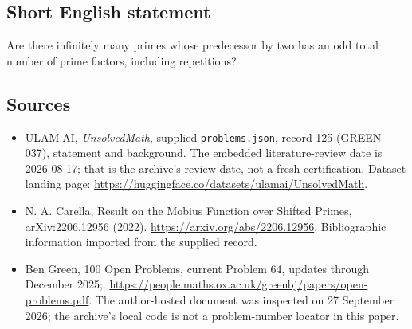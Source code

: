 \documentclass[11pt,a4paper]{article}
\begin{document}
\subsection{Short English statement}

Are there infinitely many primes whose predecessor by two has an odd total number of prime factors, including repetitions?

\subsection{Sources}

{\small

\begin{itemize}

\item[\hypertarget{source:125:1}{S1}] ULAM.AI, \emph{UnsolvedMath}, supplied \texttt{problems.json}, record 125 (GREEN-037), statement and background. The embedded literature-review date is 2026-08-17; that is the archive’s review date, not a fresh certification. Dataset landing page: \url{https://huggingface.co/datasets/ulamai/UnsolvedMath}.

\item[\hypertarget{source:125:2}{S2}] N. A. Carella, Result on the Mobius Function over Shifted Primes, arXiv:2206.12956 (2022). \url{https://arxiv.org/abs/2206.12956}. Bibliographic information imported from the supplied record.

\item[\hypertarget{source:125:3}{S3}] Ben Green, 100 Open Problems, current Problem 64, updates through December 2025;. \url{https://people.maths.ox.ac.uk/greenbj/papers/open-problems.pdf}. The author-hosted document was inspected on 27 September 2026; the archive’s local code is not a problem-number locator in this paper.

\end{itemize}

}

\label{end:125}
\end{document}
